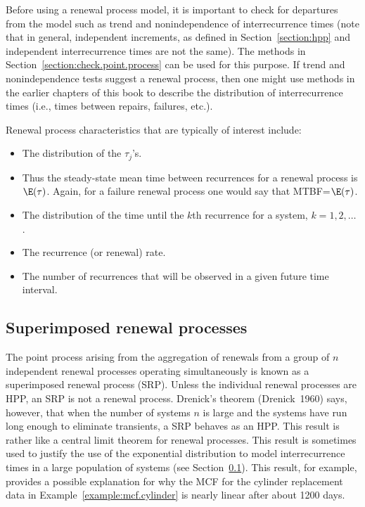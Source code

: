 Before using a renewal process model, it is important to check for
departures from the model such as trend and
nonindependence of interrecurrence times (note that in general,
independent increments, as defined in Section~\ref{section:hpp} and
independent interrecurrence times are not the same). The methods in
Section~\ref{section:check.point.process} can be used for this
purpose. If trend and nonindependence tests suggest a renewal
process, then one might use methods in the earlier chapters of this
book to describe the distribution of interrecurrence times (i.e.,
times between repairs, failures, etc.).

Renewal process characteristics that are typically of interest
include:
\begin{itemize} \itemsep 0in
\item 
The distribution of the $\tau_{j}$'s.
\item 
Thus the steady-state mean time between recurrences for a renewal
process is $\E(\tau)$.  Again, for a failure renewal process one
would say that MTBF=$\E(\tau)$.
\item
The distribution of the time until
the $k$th recurrence for a system, $k=1,2, \ldots$ .
\item
The recurrence (or renewal) rate.
\item
The number of recurrences that will be observed in a given future
time interval.
\end{itemize}

\subsection{Superimposed renewal processes}
\label{section:super.pos.of.renewal}
The point process arising from the aggregation of renewals from a
group of $n$ independent renewal processes operating simultaneously
is known as a superimposed renewal process (SRP).  Unless the
individual renewal processes are HPP, an SRP is not a renewal
process. Drenick's theorem (Drenick~1960) says, however, that when
the number of systems $n$ is large and the systems have run long
enough to eliminate transients, a SRP behaves as an HPP.  This
result is rather like a central limit theorem for renewal
processes. This result is sometimes used to justify the use of the
exponential distribution to model interrecurrence times
in a large population of systems (see
Section~\ref{section:super.pos.of.renewal}).  This result, for
example, provides a possible explanation for why the MCF for the
cylinder replacement data in Example~\ref{example:mcf.cylinder} is
nearly linear after about 1200 days.

